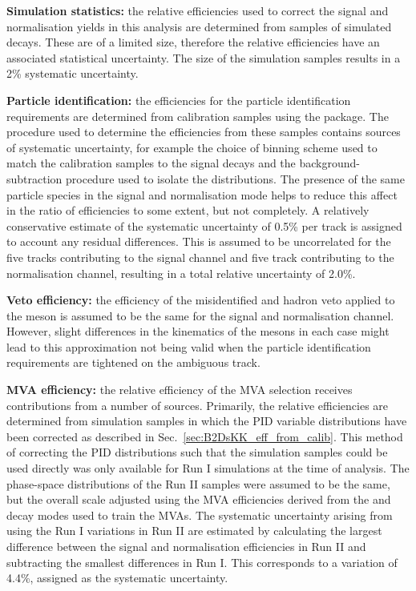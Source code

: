 \begin{description}
\item \textbf{Simulation statistics:} the relative efficiencies used to correct the signal and normalisation yields in this analysis are determined from samples of simulated decays. These are of a limited size, therefore the relative efficiencies have an associated statistical uncertainty. The size of the simulation samples results in a 2\% systematic uncertainty. 

\item \textbf{Particle identification:} the efficiencies for the particle identification requirements are determined from calibration samples using the \pidcalib package. The procedure used to determine the efficiencies from these samples contains sources of systematic uncertainty, for example the choice of binning scheme used to match the calibration samples to the signal decays and the background-subtraction procedure used to isolate the distributions. The presence of the same particle species in the signal and normalisation mode helps to reduce this affect in the ratio of efficiencies to some extent, but not completely. A relatively conservative estimate of the systematic uncertainty of 0.5\% per track is assigned to account any residual differences. This is assumed to be uncorrelated for the five tracks contributing to the signal channel and five track contributing to the normalisation channel, resulting in a total relative uncertainty of 2.0\%.

\item \textbf{Veto efficiency:} the efficiency of the misidentified \D and \Lc hadron veto applied to the \Dsp meson is assumed to be the same for the signal and normalisation channel. However, slight differences in the kinematics of the \Dsp mesons in each case might lead to this approximation not being valid when the particle identification requirements are tightened on the ambiguous track. 

\item \textbf{MVA efficiency:} the relative efficiency of the MVA selection receives contributions from a number of sources. Primarily, the relative efficiencies are determined from simulation samples in which the PID variable distributions have been corrected as described in Sec.~\ref{sec:B2DsKK_eff_from_calib}. This method of correcting the PID distributions such that the simulation samples could be used directly was only available for Run I simulations at the time of analysis. The phase-space distributions of the Run II samples were assumed to be the same, but the overall scale adjusted using the MVA efficiencies derived from the \decay{\Bs}{\jpsi\phiz} and \decay{\Bsb}{\Dsp\pim} decay modes used to train the MVAs. The systematic uncertainty arising from using the Run I variations in Run II are estimated by calculating the largest difference between the signal and normalisation efficiencies in Run II and subtracting the smallest differences in Run I. This corresponds to a variation of 4.4\%, assigned as the systematic uncertainty.


\end{description}
